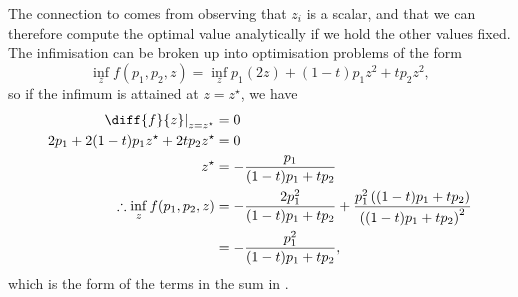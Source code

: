 \documentclass[10pt, a4paper]{article}
\numberwithin{equation}{section} %
\theoremstyle{definition}
\theoremstyle{plain}
\newcommand{\?}{\mathrel{?}} %
\begin{document}
\begin{appendices}
    The connection to  comes from observing that \(z_i\) is a scalar, and that we can therefore compute the optimal value analytically if we hold the other values fixed. The infimisation can be broken up into optimisation problems of the form
    \begin{equation}
      \inf_z f(p_1, p_2, z) = \inf_z p_1(2z) + (1-t) p_1 z^2 + t p_2 z^2,
    \end{equation}
    so if the infimum is attained at \(z=z^{\star}\), we have
    \begin{align}
      \left. \diff{f}{z} \right|_{z=z^{\star}} &= 0 \\
      2p_1 + 2(1-t) p_1 z^{\star} + 2t p_2 z^{\star} &= 0 \\
      z^{\star} &= -\frac{p_1}{(1-t)p_1 + tp_2} \\
      \therefore \inf_z f(p_1, p_2, z) &= -\frac{2p_1^2}{(1-t)p_1 + tp_2} + \frac{p_1^2 \left( (1-t)p_1 + tp_2 \right)}{{\left((1-t)p_1 + tp_2\right)}^2} \\
                                       &= -\frac{p_1^2}{(1-t)p_1 + tp_2},
    \end{align}
    which is the form of the terms in the sum in .

    \end{appendices}

    
\end{document}
